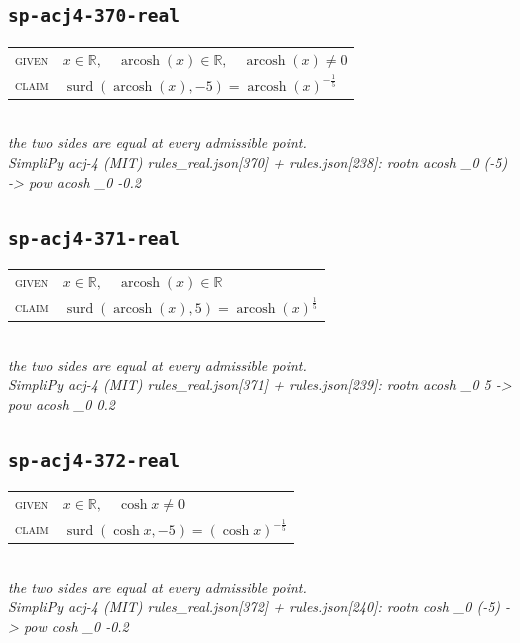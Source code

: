 \documentclass[11pt]{article}
\begin{document}
\subsection*{\texttt{sp-acj4-370-real}}
\begin{tabular}{@{}l@{\quad}l@{}}
\textsc{given} & $x \in \mathbb{R},\quad \operatorname{arcosh}\left(x\right) \in \mathbb{R},\quad \operatorname{arcosh}\left(x\right) \neq 0$ \\[4pt]
\textsc{claim} & $\displaystyle \operatorname{surd}\left(\operatorname{arcosh}\left(x\right), -5\right) = \operatorname{arcosh}\left(x\right)^{-\frac{1}{5}}$ \\
\end{tabular}\\[2pt]
{\small\emph{the two sides are equal at every admissible point.}}\\
\emph{SimpliPy acj-4 (MIT) rules\_real.json[370] + rules.json[238]: rootn acosh \_0 (-5)  ->  pow acosh \_0 -0.2}\\

\subsection*{\texttt{sp-acj4-371-real}}
\begin{tabular}{@{}l@{\quad}l@{}}
\textsc{given} & $x \in \mathbb{R},\quad \operatorname{arcosh}\left(x\right) \in \mathbb{R}$ \\[4pt]
\textsc{claim} & $\displaystyle \operatorname{surd}\left(\operatorname{arcosh}\left(x\right), 5\right) = \operatorname{arcosh}\left(x\right)^{\frac{1}{5}}$ \\
\end{tabular}\\[2pt]
{\small\emph{the two sides are equal at every admissible point.}}\\
\emph{SimpliPy acj-4 (MIT) rules\_real.json[371] + rules.json[239]: rootn acosh \_0 5  ->  pow acosh \_0 0.2}\\

\subsection*{\texttt{sp-acj4-372-real}}
\begin{tabular}{@{}l@{\quad}l@{}}
\textsc{given} & $x \in \mathbb{R},\quad \cosh x \neq 0$ \\[4pt]
\textsc{claim} & $\displaystyle \operatorname{surd}\left(\cosh x, -5\right) = \left(\cosh x\right)^{-\frac{1}{5}}$ \\
\end{tabular}\\[2pt]
{\small\emph{the two sides are equal at every admissible point.}}\\
\emph{SimpliPy acj-4 (MIT) rules\_real.json[372] + rules.json[240]: rootn cosh \_0 (-5)  ->  pow cosh \_0 -0.2}\\
\end{document}
